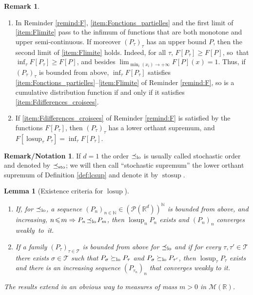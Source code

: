 \documentclass[JEP,XML,SOM,Unicode,NoEqCountersInSection,NoFloatCountersInSection,published]{cedram}
\theoremstyle{plain}
\newtheorem{lem}[them]{Lemma}
\theoremstyle{definition}
\newtheorem{remnotation}[them]{Remark/Notation} %
\newtheorem{rem}[them]{Remark}
\newcommand{\Tt}{{\mathcal T}}
\newcommand{\p}{\mathcal{P}}
\newcommand{\m}{\mathcal{M}}
\newcommand{\R}{\mathbb{R}}
\newcommand{\N}{\mathbb{N}}
\newcommand{\stosup}{\operatorname{stosup}}
\newcommand{\lcsup}{\operatorname{losup}}
\newcommand{\leqs}{\preceq_{\text{\rm sto}}}
\newcommand{\leqlc}{\preceq_{\rm lo}}
\newcommand{\geqlc}{\succeq_{\rm lo}}
\begin{document}
\skpt
\begin{rem}\label{rem:lcsup}
\begin{enumerate}
\item
\label{p:lcsupa} In Reminder \ref{remind:F}, \eqref{item:Fonctions_partielles} and the first limit of \eqref{item:Flimite} pass to the infimum of functions that are both monotone and upper semi-continuous. If moreover $(P_\tau)_\tau$ has an upper bound $P$, then the second limit of \eqref{item:Flimite} holds. Indeed, for all $\tau$, $F[P_\tau]\geqslant F[P]$, so~that $\inf_\tau F[P_\tau]\geqslant F[P]$, and besides $\lim_{\min_i(x_i)\to+\infty}F[P](x)=1$. Thus, if $(P_\tau)_\tau$ is bounded from above, $\inf_\tau F[P_\tau]$ satisfies \eqref{item:Fonctions_partielles}--\eqref{item:Flimite} of Reminder \ref{remind:F}, so is a cumulative distribution function if and only if it satisfies \eqref{item:Fdifferences_croisees}.
\item
\label{p:lcsupb} If \eqref{item:Fdifferences_croisees} of Reminder \ref{remind:F} is satisfied by the functions $F[P_\tau]$, then $(P_\tau)_\tau$ has a lower orthant supremum, and $F[\lcsup_\tau P_\tau]=\inf_\tau F[P_\tau]$.
\end{enumerate}
\end{rem}

\begin{remnotation}\label{nota:stosup} If $d=1$ the order $\leqlc$ is usually called stochastic order and denoted by $\leqs$; we will then call ``stochastic supremum'' the lower orthant supremum of Definition \ref{def:lcsup} and denote it by $\stosup$.
\end{remnotation}

\skpt
\begin{lem}[Existence criteria for $\lcsup$]
\label{lem:sto_order}
\begin{enumerate}
\item
\label{item:suite_croissante_majoree} If, for $\leqlc$, a sequence $(P_n)_{n\in \N}\!\in\!(\p(\R^d))^\N$ is bounded from above, and increasing, \ie $n\!\leqslant\! m\Rightarrow P_{n}\!\leqlc\! P_{m}$, then $\lcsup_nP_n$ exists and $(P_n)_{n}$ converges weakly~to~it.

\item
\label{item:treillis} If a family $(P_\tau)_{\tau\in\Tt}$ is bounded from above for $\leqlc$ and if for every $\tau,\tau'\in \Tt$ there exists $\sigma\in \Tt$ such that $P_\sigma\geqlc P_\tau$ and $P_\sigma\geqlc P_{\tau'}$, then $\lcsup_\tau P_\tau$ exists and there is an increasing sequence $(P_{\tau_n})_n$
that converges weakly to it.
\end{enumerate}
The results extend in an obvious way to measures of mass $m>0$ in $\m(\R)$.
\end{lem}
\end{document}
